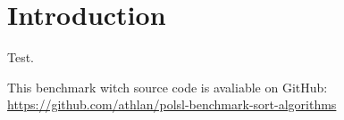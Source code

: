 \section{Introduction}
\label{sec:intro}

Test.

This benchmark witch source code is avaliable on GitHub:\\
\url{https://github.com/athlan/polsl-benchmark-sort-algorithms}
